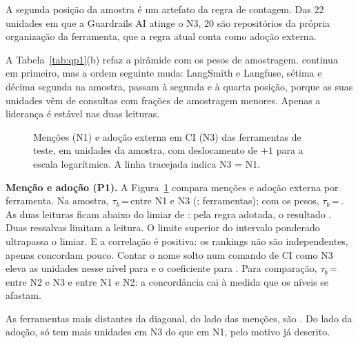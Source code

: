 \documentclass[sigconf]{acmart}
\makeatletter
\newcommand{\val}[2]{#1\,=\,#2}
\newcommand{\pval}[1]{\expandafter\msr@pval#1\@nil}
\def\msr@pval#1#2\@nil{$p$\ifx#1\ensuremath\,\else\,=\,\fi#1#2}
\makeatother
\begin{document}
A segunda posição da amostra é um artefato da regra de contagem. Das 22 unidades em que a Guardrails AI atinge o N3, 20 são repositórios da própria organização da ferramenta, que a regra atual conta como adoção externa.

A Tabela~\ref{tab:qp1}(b) refaz a pirâmide com os pesos de amostragem. \ResTopNTres{} continua em primeiro, mas a ordem seguinte muda: LangSmith e Langfuse, sétima e décima segunda na amostra, passam à segunda e à quarta posição, porque as suas unidades vêm de consultas com frações de amostragem menores. Apenas a liderança é estável nas duas leituras.

\begin{figure}[htbp]
\centering

\caption{Menções (N1) e adoção externa em CI (N3) das \ResTauFerramentas{} ferramentas de teste, em unidades da amostra, com deslocamento de $+1$ para a escala logarítmica. A linha tracejada indica N3 = N1.}
\label{fig:dispersao}
\end{figure}

\textbf{Menção e adoção (P1).} A Figura~\ref{fig:dispersao} compara menções e adoção externa por ferramenta. Na amostra, \val{$\tau_b$}{\ResTauUmTres} [\ResTauUmTresLo; \ResTauUmTresHi] entre N1 e N3 (\pval{\ResTauUmTresP}; \ResTauFerramentas{} ferramentas); com os pesos, \val{$\tau_b$}{\ResTauUmTresPond} [\ResTauUmTresPondLo; \ResTauUmTresPondHi]. As duas leituras ficam abaixo do limiar de \ResLimiarTau: pela regra adotada, o resultado \ResPUmConclusao. Duas ressalvas limitam a leitura. O limite superior do intervalo ponderado ultrapassa o limiar. E a correlação é positiva: os rankings não são independentes, apenas concordam pouco. Contar o nome solto num comando de CI como N3 eleva as unidades nesse nível para \ResUnidadesComNTresNome{} e o coeficiente para \ResTauUmTresNome. Para comparação, \val{$\tau_b$}{\ResTauDoisTres} [\ResTauDoisTresLo; \ResTauDoisTresHi] entre N2 e N3 e \ResTauUmDois{} entre N1 e N2: a concordância cai à medida que os níveis se afastam.

As ferramentas mais distantes da diagonal, do lado das menções, são \ResMaisFaladas. Do lado da adoção, só \ResMaisAdotadas{} tem mais unidades em N3 do que em N1, pelo motivo já descrito.
\end{document}
